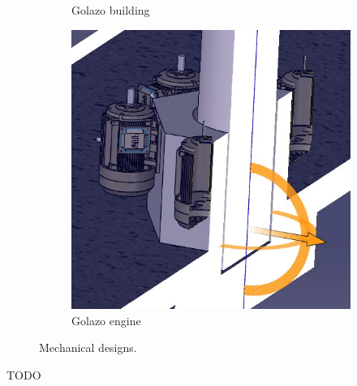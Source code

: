 \documentclass{PDS}
\begin{document}
\begin{figure}[htbp]
\begin{subfigure}[b]{0.375\textwidth}
        \caption{Golazo building}
    \end{subfigure}
    \hfill
    \begin{subfigure}[b]{0.27\textwidth}
        \includegraphics[width=\textwidth]{./figures/golazo-2.jpg}
        \caption{Golazo engine}
    \end{subfigure}
    \caption{Mechanical designs.}
\end{figure}

TODO
\end{document}

